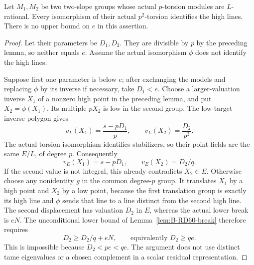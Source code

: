 \begin{proposition}
\label{prop:B-RD73-high-recovery}
Let \(M_1,M_2\) be two two-slope groups whose actual
\(p\)-torsion modules are \(L\)-rational. Every isomorphism of
their actual \(p^2\)-torsion identifies the high lines.
There is no upper bound on \(e\) in this assertion.
\end{proposition}
\begin{proof}
Let their parameters be \(D_1,D_2\).
They are divisible by \(p\) by the preceding lemma, so neither
equals \(e\). Assume the actual isomorphism \(\phi\) does not
identify the high lines.

Suppose first one parameter is below \(e\); after exchanging
the models and replacing \(\phi\) by its inverse if necessary,
take \(D_1<e\). Choose a larger-valuation inverse \(X_1\) of a
nonzero high point in the preceding lemma, and put \(X_2=\phi(X_1)\).
Its multiple \(pX_2\) is low in the second group. The low-target
inverse polygon gives
\[
 v_L(X_1)=\frac{s-pD_1}{p},\qquad
 v_L(X_2)=\frac{D_2}{p^3}.
 \tag{B-RD73.6}
\]
The actual torsion isomorphism identifies stabilizers, so their
point fields are the same \(E/L\), of degree \(p\).
Consequently
\[
 v_E(X_1)=s-pD_1,\qquad v_E(X_2)=D_2/q.
 \tag{B-RD73.7}
\]
If the second value is not integral, this already contradicts
\(X_2\in E\). Otherwise choose any nonidentity \(g\) in the
common degree-\(p\) group. It translates \(X_1\) by a high
point and \(X_2\) by a low point, because the first translation
group is exactly its high line and \(\phi\) sends that line
to a line distinct from the second high line.
The second displacement has valuation \(D_2\) in \(E\),
whereas the actual lower break is \(eN\). The unconditional
lower bound of Lemma~\ref{lem:B-RD60-break} therefore requires
\[
 D_2\ge D_2/q+eN,
 \qquad\text{equivalently }D_2\ge qe.
 \tag{B-RD73.8}
\]
This is impossible because \(D_2<pe<qe\).
The argument does not use distinct tame eigenvalues or a chosen
complement in a scalar residual representation.


\end{proof}
